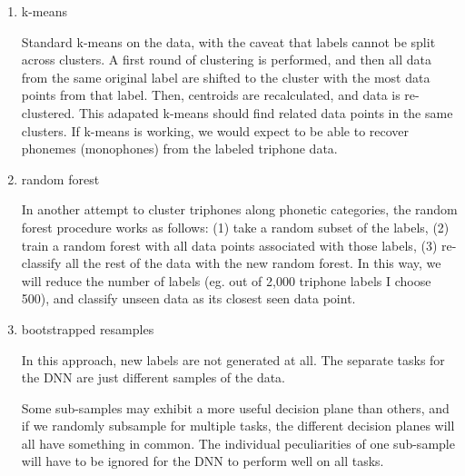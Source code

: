 \documentclass[10pt,a4paper]{article}
\begin{document}
\begin{enumerate}
  \begin{enumerate}
  \item k-means

    Standard k-means on the data, with the caveat that labels cannot be split across clusters. A first round of clustering is performed, and then all data from the same original label are shifted to the cluster with the most data points from that label. Then, centroids are recalculated, and data is re-clustered. This adapated k-means should find related data points in the same clusters. If k-means is working, we would expect to be able to recover phonemes (monophones) from the labeled triphone data.
    
  \item random forest

    In another attempt to cluster triphones along phonetic categories, the random forest procedure works as follows: (1) take a random subset of the labels, (2) train a random forest with all data points associated with those labels, (3) re-classify all the rest of the data with the new random forest. In this way, we will reduce the number of labels (eg. out of 2,000 triphone labels I choose 500), and classify unseen data as its closest seen data point.

  \item bootstrapped resamples

    In this approach, new labels are not generated at all. The separate tasks for the DNN are just different samples of the data.

    Some sub-samples may exhibit a more useful decision plane than others, and if we randomly subsample for multiple tasks, the different decision planes will all have something in common. The individual peculiarities of one sub-sample will have to be ignored for the DNN to perform well on all tasks.
    
  \end{enumerate}


\end{enumerate}
\end{document}
